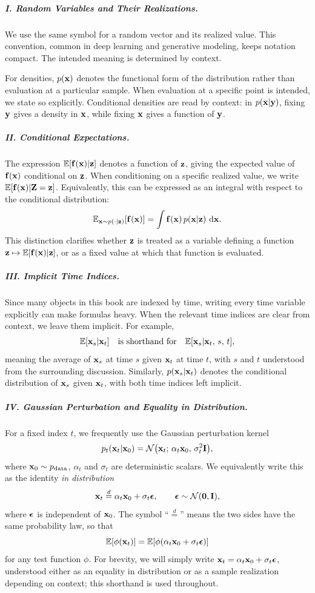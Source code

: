 \subparagraph{I. Random Variables and Their Realizations.}
We use the same symbol for a random vector and its realized value.
This convention, common in deep learning and generative modeling,
keeps notation compact. The intended meaning is determined by context.

For densities, $p({\mathbf{x}})$ denotes the functional form of the
distribution rather than evaluation at a particular sample. When
evaluation at a specific point is intended, we state so explicitly.
Conditional densities are read by context: in $p({\mathbf{x}}|{\mathbf{y}})$, fixing
${\mathbf{y}}$ gives a density in ${\mathbf{x}}$, while fixing ${\mathbf{x}}$ gives a
function of ${\mathbf{y}}$.

\subparagraph{II. Conditional Expectations.}
The expression $\mathbb{E}[{\mathbf{f}}({\mathbf{x}})|{\mathbf{z}}]$ denotes a function of ${\mathbf{z}}$,
giving the expected value of ${\mathbf{f}}({\mathbf{x}})$ conditional on ${\mathbf{z}}$.
When conditioning on a specific realized value, we write
$\mathbb{E}[{\mathbf{f}}({\mathbf{x}})|{\mathbf{Z}} = {\mathbf{z}}]$. Equivalently, this can be expressed as
an integral with respect to the conditional distribution:
\[
\mathbb{E}_{{\mathbf{x}} \sim p(\cdot|{\mathbf{z}})}[{\mathbf{f}}({\mathbf{x}})]
= \int {\mathbf{f}}({\mathbf{x}})\, p({\mathbf{x}}|{\mathbf{z}})\, \mathop{}\!\mathrm{d}{\mathbf{x}}.
\]
This distinction clarifies whether ${\mathbf{z}}$ is treated as a variable
defining a function ${\mathbf{z}} \mapsto \mathbb{E}[{\mathbf{f}}({\mathbf{x}})|{\mathbf{z}}]$, or as a
fixed value at which that function is evaluated.

\subparagraph{III. Implicit Time Indices.}
Since many objects in this book are indexed by time, writing every
time variable explicitly can make formulas heavy. When the relevant
time indices are clear from context, we leave them implicit. For
example,
\[
\mathbb{E}[{\mathbf{x}}_s | {\mathbf{x}}_t]
\quad\text{is shorthand for}\quad
\mathbb{E}[{\mathbf{x}}_s | {\mathbf{x}}_t,\, s,\, t],
\]
meaning the average of ${\mathbf{x}}_s$ at time $s$ given ${\mathbf{x}}_t$ at time
$t$, with $s$ and $t$ understood from the surrounding discussion.
Similarly, $p({\mathbf{x}}_s | {\mathbf{x}}_t)$ denotes the conditional distribution
of ${\mathbf{x}}_s$ given ${\mathbf{x}}_t$, with both time indices left implicit.

\subparagraph{IV. Gaussian Perturbation and Equality in Distribution.}
For a fixed index $t$, we frequently use the Gaussian perturbation
kernel
\[
p_t({\mathbf{x}}_t|{\mathbf{x}}_0)
= \mathcal{N}\big({\mathbf{x}}_t;\, \alpha_t {\mathbf{x}}_0,\, \sigma_t^2 {\mathbf{I}}\big),
\]
where ${\mathbf{x}}_0 \sim p_{\mathrm{data}}$, $\alpha_t$ and $\sigma_t$ are
deterministic scalars. We equivalently write this as the identity
\emph{in distribution}
\[
{\mathbf{x}}_t \stackrel{d}{=} \alpha_t {\mathbf{x}}_0 + \sigma_t {\bm{\epsilon}},
\qquad
{\bm{\epsilon}} \sim \mathcal{N}(\bm{0}, {\mathbf{I}}),
\]
where ${\bm{\epsilon}}$ is independent of ${\mathbf{x}}_0$. The symbol
``$\stackrel{d}{=}$'' means the two sides have the same probability
law, so that 
\[
    \mathbb{E}[\phi({\mathbf{x}}_t)] = \mathbb{E}[\phi(\alpha_t {\mathbf{x}}_0 + \sigma_t {\bm{\epsilon}})]
\]
for any test function $\phi$. For brevity, we will simply
write ${\mathbf{x}}_t = \alpha_t {\mathbf{x}}_0 + \sigma_t {\bm{\epsilon}}$, understood either
as an equality in distribution or as a sample realization depending
on context; this shorthand is used throughout.